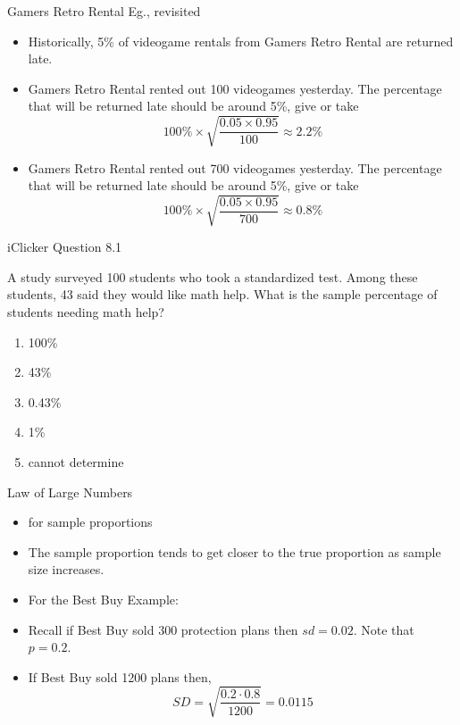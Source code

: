 \documentclass[14pt]{beamer}\usepackage[]{graphicx}\usepackage[]{color}
\begin{document}
\begin{frame}[fragile]{Gamers Retro Rental Eg., revisited}

{\footnotesize{
\begin{itemize}
\item<1-> Historically, 5\% of videogame rentals from Gamers Retro Rental are returned late.
\item<2-> Gamers Retro Rental rented out 100 videogames yesterday. The percentage  that will be returned late should be around 5\%, give or take
\begin{equation*}
100\% \times \sqrt{ \frac{ 0.05 \times 0.95}{100}} \approx 2.2\%
\end{equation*}
\item<3-> Gamers Retro Rental  rented out 700 videogames yesterday. The percentage  that will be returned late should be around 5\%, give or take
\begin{equation*}
100\% \times \sqrt{ \frac{ 0.05 \times 0.95}{700}} \approx 0.8\%
\end{equation*}
\end{itemize}
}}
\end{frame}

\begin{frame}[fragile]{iClicker Question 8.1}

A study surveyed 100 students who took a standardized test. Among  these students, 43 said they would like math help. What is the sample  percentage of students needing math help?

\begin{enumerate}
\item 100\%
\item 43\%
\item 0.43\%
\item 1\%
\item cannot determine
\end{enumerate}
\end{frame}

\begin{frame}[fragile]{Law of Large Numbers}

\begin{itemize}
\item<1-> for sample proportions
\item<1-> The sample proportion tends to get closer to the true proportion as  sample size increases.

\item<2-> For the Best Buy Example:
\item<2-> Recall if Best Buy sold 300 protection plans then $sd = 0.02$. Note that  $p = 0.2$.

\item<3-> If Best Buy sold 1200 plans then,
\begin{equation*}
SD = \sqrt{ \frac{ 0.2 \cdot 0.8}{1200}} = 0.0115
\end{equation*}
\end{itemize}
\end{frame}
\end{document}
